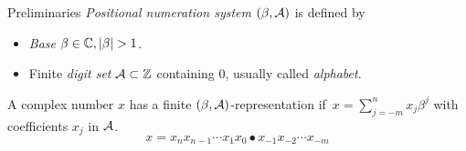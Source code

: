   {Preliminaries}
  \textit{Positional numeration system} $(\beta, \mathcal{A})$ is defined by
  \begin{itemize}
    \item \textit{Base} $\beta \in \CC, |\beta|>1$.
    \item Finite \textit{digit set}  $\mathcal{A} \subset \mathbb{Z}$ containing 0, usually called \textit{alphabet}.
  \end{itemize} 

  
  A complex number $x$ has a finite  $(\beta, \mathcal{A})$-representation if~$x=\sum_{j=-m}^n x_j \beta^j$ with coefficients $x_j$ in $\mathcal{A}$.
  $$
    x=x_n x_{n-1}\cdots x_1 x_0 \bullet x_{-1} x_{-2} \cdots x_{-m}
  $$ 